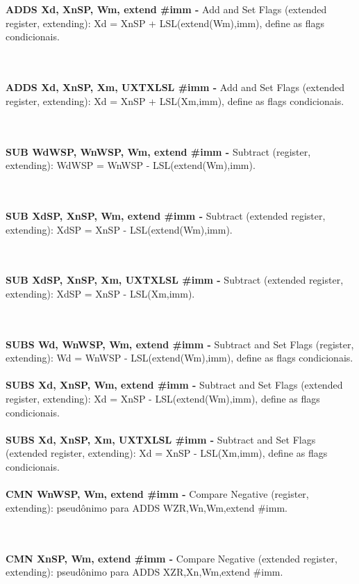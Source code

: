 \documentclass[12pt,a4paper,utf8]{ppgsi}
\begin{document}
\\\\\textbf{ADDS Xd, Xn\textbar SP, Wm, extend {#imm} -} Add and Set Flags (extended register, extending): Xd = Xn\textbar SP + LSL(extend(Wm),imm), define as flags condicionais.  

\\\\\textbf{ADDS Xd, Xn\textbar SP, Xm{, UXTX\textbar LSL \#imm} -} Add and Set Flags (extended register, extending): Xd = Xn\textbar SP + LSL(Xm,imm), define as flags condicionais.  

\\\\\textbf{SUB Wd\textbar WSP, Wn\textbar WSP, Wm, extend {#imm} -} Subtract (register, extending): Wd\textbar WSP = Wn\textbar WSP - LSL(extend(Wm),imm).

\\\\\textbf{SUB Xd\textbar SP, Xn\textbar SP, Wm, extend {#imm} -} Subtract (extended register, extending): Xd\textbar SP = Xn\textbar SP - LSL(extend(Wm),imm). 

\\\\\textbf{SUB Xd\textbar SP, Xn\textbar SP, Xm{, UXTX\textbar LSL \#imm} -} Subtract (extended register, extending): Xd\textbar SP = Xn\textbar SP - LSL(Xm,imm). 

\\\\\textbf{SUBS Wd, Wn\textbar WSP, Wm, extend {#imm} -} Subtract and Set Flags (register, extending): Wd = Wn\textbar WSP - LSL(extend(Wm),imm), define as flags condicionais.  
\\\\\textbf{SUBS Xd, Xn\textbar SP, Wm, extend {#imm} -} Subtract and Set Flags (extended register, extending): Xd = Xn\textbar SP - LSL(extend(Wm),imm),
define as flags condicionais.  
\\\\\textbf{SUBS Xd, Xn\textbar SP, Xm{, UXTX\textbar LSL \#imm} -} Subtract and Set Flags (extended register, extending): Xd = Xn\textbar SP - LSL(Xm,imm), define as flags condicionais. 
\\\\\textbf{CMN Wn\textbar WSP, Wm, extend {#imm} -} Compare Negative (register, extending): pseudônimo para ADDS WZR,Wn,Wm,extend {#imm}. 

\\\\\textbf{CMN Xn\textbar SP, Wm, extend {#imm} -} Compare Negative (extended register, extending): pseudônimo para ADDS XZR,Xn,Wm,extend {#imm}. 
\end{document}
